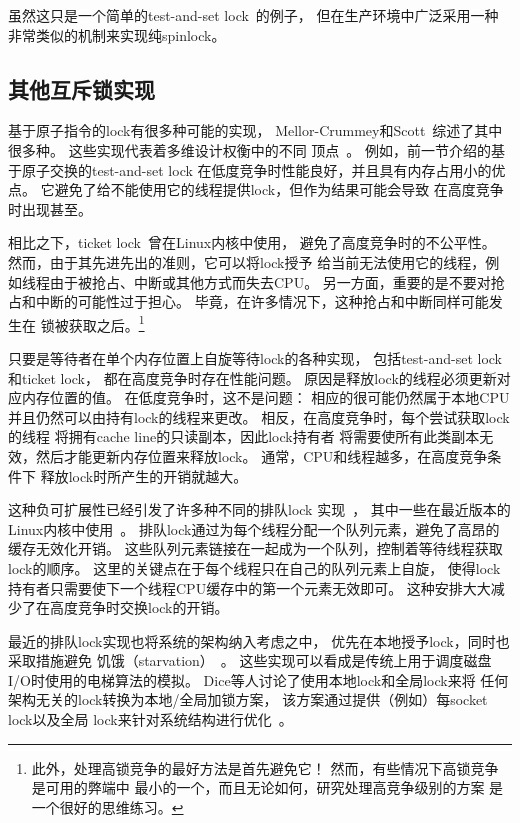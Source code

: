 虽然这只是一个简单的test-and-set lock~\cite{Segall84}的例子，
但在生产环境中广泛采用一种非常类似的机制来实现纯spinlock。

\subsection{其他互斥锁实现}
\label{sec:locking:Other Exclusive-Locking Implementations}

基于原子指令的lock有很多种可能的实现，
Mellor-Crummey和Scott~\cite{MellorCrummey91a}综述了其中很多种。
这些实现代表着多维设计权衡中的不同
顶点~\cite{Guerraoui:2019:LPA:3319851.3301501,HugoGuirouxPhD,McKenney96a}。
例如，前一节介绍的基于原子交换的test-and-set lock
在低度竞争时性能良好，并且具有内存占用小的优点。
它避免了给不能使用它的线程提供lock，但作为结果可能会导致
在高度竞争时出现甚至。

相比之下，ticket lock~\cite{MellorCrummey91a}曾在Linux内核中使用，
避免了高度竞争时的不公平性。
然而，由于其先进先出的准则，它可以将lock授予
给当前无法使用它的线程，例如线程由于被抢占、中断或其他方式而失去CPU。
另一方面，重要的是不要对抢占和中断的可能性过于担心。
毕竟，在许多情况下，这种抢占和中断同样可能发生在
锁被获取之后。\footnote{
	此外，处理高锁竞争的最好方法是首先避免它！
	然而，有些情况下高锁竞争是可用的弊端中
	最小的一个，而且无论如何，研究处理高竞争级别的方案
	是一个很好的思维练习。}

只要是等待者在单个内存位置上自旋等待lock的各种实现，
包括test-and-set lock和ticket lock，
都在高度竞争时存在性能问题。
原因是释放lock的线程必须更新对应内存位置的值。
在低度竞争时，这不是问题：
相应的很可能仍然属于本地CPU并且仍然可以由持有lock的线程来更改。
相反，在高度竞争时，每个尝试获取lock的线程
将拥有cache line的只读副本，因此lock持有者
将需要使所有此类副本无效，然后才能更新内存位置来释放lock。
通常，CPU和线程越多，在高度竞争条件下
释放lock时所产生的开销就越大。

这种负可扩展性已经引发了许多种不同的排队lock
实现~\cite{Anderson90,Graunke90,MellorCrummey91a,Wisniewski94,Craig93,Magnusson94,Takada93}，
其中一些在最近版本的Linux内核中使用~\cite{JonathanCorbet2014qspinlocks}。
排队lock通过为每个线程分配一个队列元素，避免了高昂的缓存无效化开销。
这些队列元素链接在一起成为一个队列，控制着等待线程获取lock的顺序。
这里的关键点在于每个线程只在自己的队列元素上自旋，
使得lock持有者只需要使下一个线程CPU缓存中的第一个元素无效即可。
这种安排大大减少了在高度竞争时交换lock的开销。

最近的排队lock实现也将系统的架构纳入考虑之中，
优先在本地授予lock，同时也采取措施避免
饥饿（starvation）~\cite{McKenney02e,radovic03hierarchical,radovic02efficient,BenJackson02,McKenney02d}。
这些实现可以看成是传统上用于调度磁盘I/O时使用的电梯算法的模拟。
Dice等人讨论了使用本地lock和全局lock来将
任何架构无关的lock转换为本地/全局加锁方案，
该方案通过提供（例如）每socket lock以及全局
lock来针对系统结构进行优化~\cite{DavidDice2012NUMAlock1,DavidDice2012NUMAlock2}。

